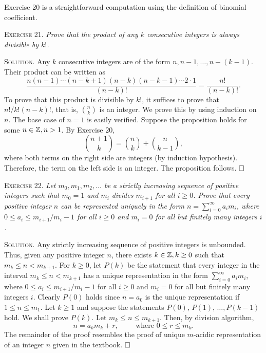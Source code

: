 \documentclass[11pt, leqno]{article}
\newcommand{\done}{\ensuremath{\hfill\square}}
\begin{document}
Exercise 20 is a straightforward computation using the definition of binomial coefficient.

\textsc{Exercise 21}. \emph{Prove that the product of any $k$ consecutive integers is always divisible by $k!$.}

\textsc{Solution}. Any $k$ consecutive integers are of the form $n, n-1, \ldots, n-(k-1)$. Their product can be written as 
\begin{displaymath}
\frac{n(n-1)\cdots (n-k+1)(n-k)(n-k-1)\cdots 2\cdot 1}{(n-k)!} = \frac{n!}{(n-k)!}.
\end{displaymath}
To prove that this product is divisible by $k!$, it suffices to prove that $n!/k!(n-k)!$, that is, $\binom{n}{k}$ is an integer. We prove this by using induction on $n$. The base case of $n=1$ is easily verified. Suppose the proposition holds for some $n\in\mathbb{Z}, n>1$. By Exercise $20$, 
\begin{displaymath}
\binom{n+1}{k} = \binom{n}{k} + \binom{n}{k-1},
\end{displaymath}
where both terms on the right side are integers (by induction hypothesis). Therefore, the term on the left side is an integer. The proposition follows. \done

\textsc{Exercise 22}. \emph{Let $m_0, m_1, m_2,\ldots$ be a strictly increasing sequence of positive integers such that $m_0=1$ and $m_i$ divides $m_{i+1}$ for all $i\geq 0$. Prove that every positive integer $n$ can be represented uniquely in the form $n = \sum_{i=0}^{\infty}a_im_i$, where $0\leq a_i \leq m_{i+1}/m_i-1$ for all $i\geq 0$ and $m_i=0$ for all but finitely many integers $i$.}

\textsc{Solution}. Any strictly increasing sequence of positive integers is unbounded. Thus, given any positive integer $n$, there exists $k\in\mathbb{Z}, k\geq 0$ such that $m_k \leq n < m_{k+1}$. For $k\geq 0$, let $P(k)$ be the statement that every integer in the interval $m_k \leq n < m_{k+1}$ has a unique representation in the form $\sum_{i=0}^{\infty} a_im_i$, where $0\leq a_i \leq m_{i+1}/m_i-1$ for all $i\geq 0$ and $m_i=0$ for all but finitely many integers $i$. Clearly $P(0)$ holds since $n=a_0$ is the unique representation if $1 \leq n \leq m_1$. Let $k\geq 1$ and suppose the statements $P(0)$, $P(1)$, $\ldots, P(k-1)$ hold. We shall prove $P(k)$. Let $m_k \leq n \leq m_{k+1}$. Then, by division algorithm, 
\begin{displaymath}
n = a_k m_k + r, \hspace{1cm} \text{where } 0\leq r \leq m_k.
\end{displaymath}
The remainder of the proof resembles the proof of unique $m$-acidic representation of an integer $n$ given in the textbook. \done
\end{document}
